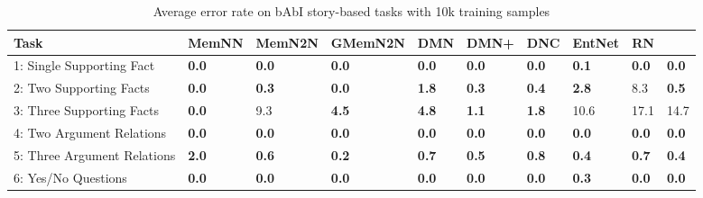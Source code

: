\documentclass[ko,indentfirst,twoside,ms]{snuthesis_utf8}
\begin{document}
\clearpage
\begin{table}[h]
\centering
	\caption{Average error rate on bAbI story-based tasks with 10k training samples}
	\label{table:babi_result}
\begin{adjustbox}{max width=0.95\textwidth}
\begin{tabular}{l|llllllll>{\columncolor[gray]{0.8}}l}
\hline
Task                                 & \multicolumn{1}{c}{MemNN} & \multicolumn{1}{c}{MemN2N} & \multicolumn{1}{c}{GMemN2N} & \multicolumn{1}{c}{DMN} & \multicolumn{1}{c}{DMN+} & \multicolumn{1}{c}{DNC} & \multicolumn{1}{c}{EntNet\footnotemark}& \multicolumn{1}{c}{RN\footnotemark} & \multicolumn{1}{c}{RMN} \\ \hline
1: Single Supporting Fact            & \textbf{0.0}                       & \textbf{0.0}                        & \textbf{0.0} & \textbf{0.0}                     & \textbf{0.0}                      & \textbf{0.0}                     & \textbf{0.1}                        & \textbf{0.0}                    & \textbf{0.0}                     \\
2: Two Supporting Facts              & \textbf{0.0}                       & \textbf{0.3}                        & \textbf{0.0}                         & \textbf{1.8}                     & \textbf{0.3}                      & \textbf{0.4}                     & \textbf{2.8} & 8.3                    & \textbf{0.5}                     \\
3: Three Supporting Facts            & \textbf{0.0}                       & 9.3                        & \textbf{4.5                        } & \textbf{4.8}                     & \textbf{1.1}                      & \textbf{1.8}                     & 10.6                       & 17.1                  & 14.7                     \\
4: Two Argument Relations            & \textbf{0.0}                       & \textbf{0.0}                        & \textbf{0.0} & \textbf{0.0}                     & \textbf{0.0}                    & \textbf{0.0}                    & \textbf{0.0} & \textbf{0.0}                    & \textbf{0.0}                   \\
5: Three Argument Relations          & \textbf{2.0 }                      & \textbf{0.6}                        & \textbf{0.2 } & \textbf{0.7}                     & \textbf{0.5}                     &\textbf{0.8}                     &\textbf{0.4}                       & \textbf{0.7}                   & \textbf{0.4}                     \\
6: Yes/No Questions                  & \textbf{0.0}                       & \textbf{0.0}                        & \textbf{0.0} & \textbf{0.0}                     & \textbf{0.0}                      & \textbf{0.0}                     & \textbf{0.3}                       & \textbf{0.0}                    & \textbf{0.0}                     \\

\end{tabular}
\end{adjustbox}
\end{table}
\end{document}
